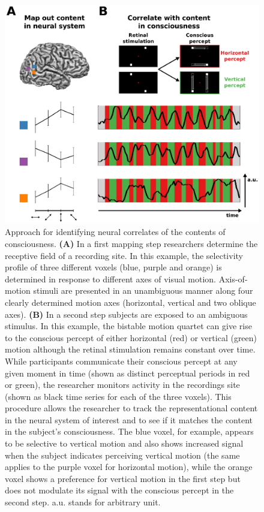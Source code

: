 \begin{figure}[!htbp]
\centering
\includegraphics[width=\textwidth]{figures/chapter_01/fig1.eps}
\caption{Approach for identifying neural correlates of the contents of consciousness. \textbf{(A)} In a first mapping step researchers determine the receptive field of a recording site. In this example, the selectivity profile of three different voxels (blue, purple and orange) is determined in response to different axes of visual motion. Axis-of-motion stimuli are presented in an unambiguous manner along four clearly determined motion axes (horizontal, vertical and two oblique axes). \textbf{(B)} In a second step subjects are exposed to an ambiguous stimulus. In this example, the bistable motion quartet can give rise to the conscious percept of either horizontal (red) or vertical (green) motion although the retinal stimulation remains constant over time. While participants communicate their conscious percept at any given moment in time  (shown as distinct perceptual periods in red or green), the researcher monitors activity in the recordings site (shown as black time series for each of the three voxels). This procedure allows the researcher to track the representational content in the neural system of interest and to see if it matches the content in the subject's consciousness. The blue voxel, for example, appears to be selective to vertical motion and also shows increased signal when the subject indicates perceiving vertical motion (the same applies to the purple voxel for horizontal motion), while the orange voxel shows a preference for vertical motion in the first step but does not modulate its signal with the conscious percept in the second step. a.u. stands for arbitrary unit.}
\label{fig:ncc} 
\end{figure}

